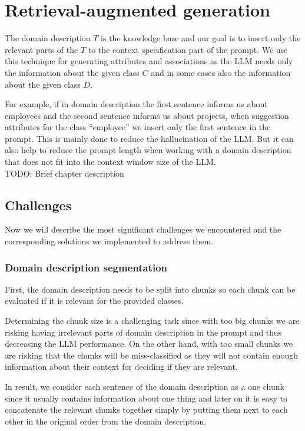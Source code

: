 \section{Retrieval-augmented generation}

The domain description $T$ is the knowledge base and our goal is to insert only the relevant parts of the $T$ to the context specification part of the prompt. We use this technique for generating attributes and associations as the LLM needs only the information about the given class $C$ and in some cases also the information about the given class $D$.

For example, if in domain description the first sentence informs us about employees and the second sentence informs us about projects, when suggestion attributes for the class ``employee'' we insert only the first sentence in the prompt. This is mainly done to reduce the hallucination of the LLM. But it can also help to reduce the prompt length when working with a domain description that does not fit into the context window size of the LLM. \\

TODO: Brief chapter description \\


\subsection{Challenges}

Now we will describe the most significant challenges we encountered and the corresponding solutions we implemented to address them.

\subsubsection{Domain description segmentation}

First, the domain description needs to be split into chunks so each chunk can be evaluated if it is relevant for the provided classes.

Determining the chunk size is a challenging task since with too big chunks we are risking having irrelevant parts of domain description in the prompt and thus decreasing the LLM performance. On the other hand, with too small chunks we are risking that the chunks will be miss-classified as they will not contain enough information about their context for deciding if they are relevant.

In result, we consider each sentence of the domain description as a one chunk since it usually contains information about one thing and later on it is easy to concatenate the relevant chunks together simply by putting them next to each other in the original order from the domain description. \\

